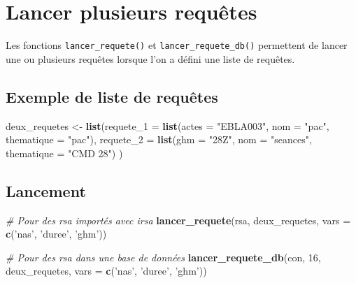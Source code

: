 \documentclass[]{book}
\newenvironment{Shaded}{\begin{snugshade}}{\end{snugshade}}
\newcommand{\KeywordTok}[1]{\textcolor[rgb]{0.13,0.29,0.53}{\textbf{#1}}}
\newcommand{\DataTypeTok}[1]{\textcolor[rgb]{0.13,0.29,0.53}{#1}}
\newcommand{\DecValTok}[1]{\textcolor[rgb]{0.00,0.00,0.81}{#1}}
\newcommand{\StringTok}[1]{\textcolor[rgb]{0.31,0.60,0.02}{#1}}
\newcommand{\CommentTok}[1]{\textcolor[rgb]{0.56,0.35,0.01}{\textit{#1}}}
\newcommand{\NormalTok}[1]{#1}
\begin{document}
\section{Lancer plusieurs requêtes}\label{lancer-plusieurs-requetes}

Les fonctions \texttt{lancer\_requete()} et
\texttt{lancer\_requete\_db()} permettent de lancer une ou plusieurs
requêtes lorsque l'on a défini une liste de requêtes.

\subsection{Exemple de liste de
requêtes}\label{exemple-de-liste-de-requetes}

\begin{Shaded}
\begin{Highlighting}[]
\NormalTok{deux_requetes <-}\StringTok{ }\KeywordTok{list}\NormalTok{(}\DataTypeTok{requete_1 =} \KeywordTok{list}\NormalTok{(}\DataTypeTok{actes =} \StringTok{"EBLA003"}\NormalTok{, }\DataTypeTok{nom =} \StringTok{"pac"}\NormalTok{, }\DataTypeTok{thematique =} \StringTok{"pac"}\NormalTok{),}
                      \DataTypeTok{requete_2 =} \KeywordTok{list}\NormalTok{(}\DataTypeTok{ghm =} \StringTok{"28Z"}\NormalTok{, }\DataTypeTok{nom =} \StringTok{"seances"}\NormalTok{, }\DataTypeTok{thematique =} \StringTok{"CMD 28"}\NormalTok{)}
\NormalTok{)}
\end{Highlighting}
\end{Shaded}

\subsection{Lancement}\label{lancement}

\begin{Shaded}
\begin{Highlighting}[]
\CommentTok{# Pour des rsa importés avec irsa}
\KeywordTok{lancer_requete}\NormalTok{(rsa, deux_requetes, }\DataTypeTok{vars =} \KeywordTok{c}\NormalTok{(}\StringTok{'nas'}\NormalTok{, }\StringTok{'duree'}\NormalTok{, }\StringTok{'ghm'}\NormalTok{))}

\CommentTok{# Pour des rsa dans une base de données}
\KeywordTok{lancer_requete_db}\NormalTok{(con, }\DecValTok{16}\NormalTok{, deux_requetes, }\DataTypeTok{vars =} \KeywordTok{c}\NormalTok{(}\StringTok{'nas'}\NormalTok{, }\StringTok{'duree'}\NormalTok{, }\StringTok{'ghm'}\NormalTok{))}
\end{Highlighting}
\end{Shaded}
\end{document}
